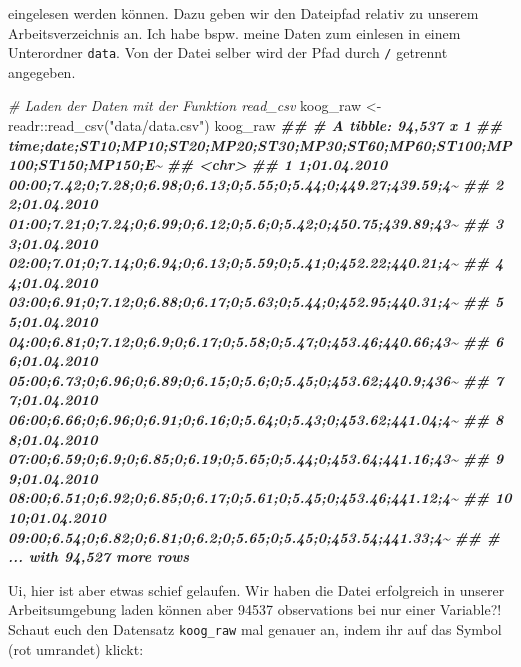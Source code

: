 \documentclass[
]{article}
\newenvironment{Shaded}{\begin{snugshade}}{\end{snugshade}}
\newcommand{\CommentTok}[1]{\textcolor[rgb]{0.56,0.35,0.01}{\textit{#1}}}
\newcommand{\DocumentationTok}[1]{\textcolor[rgb]{0.56,0.35,0.01}{\textbf{\textit{#1}}}}
\newcommand{\FunctionTok}[1]{\textcolor[rgb]{0.00,0.00,0.00}{#1}}
\newcommand{\NormalTok}[1]{#1}
\newcommand{\OtherTok}[1]{\textcolor[rgb]{0.56,0.35,0.01}{#1}}
\newcommand{\SpecialCharTok}[1]{\textcolor[rgb]{0.00,0.00,0.00}{#1}}
\newcommand{\StringTok}[1]{\textcolor[rgb]{0.31,0.60,0.02}{#1}}
\begin{document}
eingelesen werden können. Dazu geben wir den Dateipfad relativ zu unserem Arbeitsverzeichnis an. Ich habe bspw. meine Daten zum einlesen in einem Unterordner \texttt{data}. Von der Datei selber wird der Pfad durch \texttt{/} getrennt angegeben.

\begin{Shaded}
\begin{Highlighting}[]
\CommentTok{\# Laden der Daten mit der Funktion read\_csv}
\NormalTok{koog\_raw }\OtherTok{\textless{}{-}}\NormalTok{ readr}\SpecialCharTok{::}\FunctionTok{read\_csv}\NormalTok{(}\StringTok{"data/data.csv"}\NormalTok{)}
\NormalTok{koog\_raw}
\DocumentationTok{\#\# \# A tibble: 94,537 x 1}
\DocumentationTok{\#\#    \textasciigrave{}time;date;ST10;MP10;ST20;MP20;ST30;MP30;ST60;MP60;ST100;MP100;ST150;MP150;E\textasciitilde{}}
\DocumentationTok{\#\#    \textless{}chr\textgreater{}                                                                        }
\DocumentationTok{\#\#  1 1;01.04.2010 00:00;7.42;0;7.28;0;6.98;0;6.13;0;5.55;0;5.44;0;449.27;439.59;4\textasciitilde{}}
\DocumentationTok{\#\#  2 2;01.04.2010 01:00;7.21;0;7.24;0;6.99;0;6.12;0;5.6;0;5.42;0;450.75;439.89;43\textasciitilde{}}
\DocumentationTok{\#\#  3 3;01.04.2010 02:00;7.01;0;7.14;0;6.94;0;6.13;0;5.59;0;5.41;0;452.22;440.21;4\textasciitilde{}}
\DocumentationTok{\#\#  4 4;01.04.2010 03:00;6.91;0;7.12;0;6.88;0;6.17;0;5.63;0;5.44;0;452.95;440.31;4\textasciitilde{}}
\DocumentationTok{\#\#  5 5;01.04.2010 04:00;6.81;0;7.12;0;6.9;0;6.17;0;5.58;0;5.47;0;453.46;440.66;43\textasciitilde{}}
\DocumentationTok{\#\#  6 6;01.04.2010 05:00;6.73;0;6.96;0;6.89;0;6.15;0;5.6;0;5.45;0;453.62;440.9;436\textasciitilde{}}
\DocumentationTok{\#\#  7 7;01.04.2010 06:00;6.66;0;6.96;0;6.91;0;6.16;0;5.64;0;5.43;0;453.62;441.04;4\textasciitilde{}}
\DocumentationTok{\#\#  8 8;01.04.2010 07:00;6.59;0;6.9;0;6.85;0;6.19;0;5.65;0;5.44;0;453.64;441.16;43\textasciitilde{}}
\DocumentationTok{\#\#  9 9;01.04.2010 08:00;6.51;0;6.92;0;6.85;0;6.17;0;5.61;0;5.45;0;453.46;441.12;4\textasciitilde{}}
\DocumentationTok{\#\# 10 10;01.04.2010 09:00;6.54;0;6.82;0;6.81;0;6.2;0;5.65;0;5.45;0;453.54;441.33;4\textasciitilde{}}
\DocumentationTok{\#\# \# ... with 94,527 more rows}
\end{Highlighting}
\end{Shaded}

Ui, hier ist aber etwas schief gelaufen. Wir haben die Datei erfolgreich in unserer Arbeitsumgebung laden können aber 94537 observations bei nur einer Variable?! Schaut euch den Datensatz \texttt{koog\_raw} mal genauer an, indem ihr auf das Symbol (rot umrandet) klickt:
\end{document}

